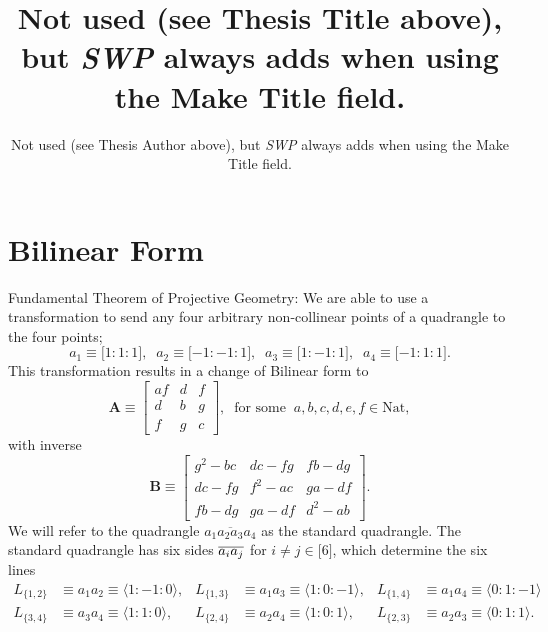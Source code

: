 \documentclass{unswthesis}
\begin{document}
\thesisdate{}
\thesisassessor{}
\title{Not used (see Thesis Title above), but \textsl{SWP} always adds when
using the Make Title field.}
\author{Not used (see Thesis Author above), but \textsl{SWP} always adds
when using the Make Title field.}
\maketitle
\tableofcontents
\listoffigures
\listoftables

\chapter{Bilinear Form}

Fundamental Theorem of Projective Geometry:\newline
We are able to use a transformation to send any four arbitrary non-collinear
points of a quadrangle to the four points; 
\begin{equation*}
a_{1}\equiv \lbrack 1:1:1],\;\;a_{2}\equiv \lbrack -1:-1:1],\;\;a_{3}\equiv
\lbrack 1:-1:1],\;\;a_{4}\equiv \lbrack -1:1:1].
\end{equation*}%
This transformation results in a change of Bilinear form to 
\begin{equation*}
\mathbf{A}\equiv 
\begin{bmatrix}
af & d & f \\ 
d & b & g \\ 
f & g & c%
\end{bmatrix}%
,\;\;\text{for some}\;\;a,b,c,d,e,f\in \text{Nat},
\end{equation*}%
with inverse 
\begin{equation*}
\mathbf{B}\equiv 
\begin{bmatrix}
g^{2}-bc & dc-fg & fb-dg \\ 
dc-fg & f^{2}-ac & ga-df \\ 
fb-dg & ga-df & d^{2}-ab%
\end{bmatrix}%
.
\end{equation*}%
We will refer to the quadrangle $\overline{a_{1}a_{2}a_{3}a_{4}}$ as the
standard quadrangle. The standard quadrangle has six sides $\overline{%
a_{i}a_{j}}$ for $i\neq j\in \lbrack 6]$, which determine the six lines 
\begin{align*}
L_{\{1,2\}}& \equiv a_{1}a_{2}\equiv \langle 1:-1:0\rangle , & L_{\{1,3\}}&
\equiv a_{1}a_{3}\equiv \langle 1:0:-1\rangle , & L_{\{1,4\}}& \equiv
a_{1}a_{4}\equiv \langle 0:1:-1\rangle  \\
L_{\{3,4\}}& \equiv a_{3}a_{4}\equiv \langle 1:1:0\rangle , & L_{\{2,4\}}&
\equiv a_{2}a_{4}\equiv \langle 1:0:1\rangle , & L_{\{2,3\}}& \equiv
a_{2}a_{3}\equiv \langle 0:1:1\rangle .
\end{align*}
\end{document}
